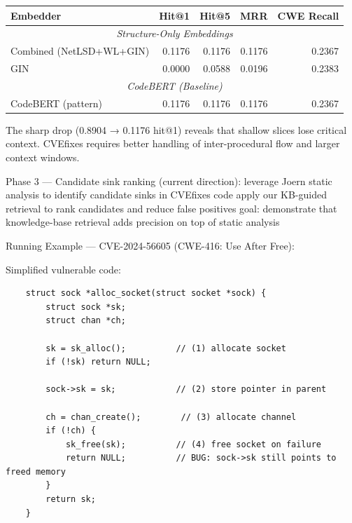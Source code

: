     \begin{center}
    \begin{tabular}{|l|r|r|r|r|}
    \hline
    \textbf{Embedder} & \textbf{Hit@1} & \textbf{Hit@5} & \textbf{MRR} & \textbf{CWE Recall} \\
    \hline
    \hline
    \multicolumn{5}{|c|}{\textit{Structure-Only Embeddings}} \\
    \hline
    Combined (NetLSD+WL+GIN) & 0.1176 & 0.1176 & 0.1176 & 0.2367 \\
    GIN & 0.0000 & 0.0588 & 0.0196 & 0.2383 \\
    \hline
    \multicolumn{5}{|c|}{\textit{CodeBERT (Baseline)}} \\
    \hline
    CodeBERT (pattern) & 0.1176 & 0.1176 & 0.1176 & 0.2367 \\
    \hline
    \end{tabular}
    \end{center}

    The sharp drop (0.8904 → 0.1176 hit@1) reveals that shallow slices lose critical context. CVEfixes requires better handling of inter-procedural flow and larger context windows.

Phase 3 — Candidate sink ranking (current direction):
    leverage Joern static analysis to identify candidate sinks in CVEfixes code
    apply our KB-guided retrieval to rank candidates and reduce false positives
    goal: demonstrate that knowledge-base retrieval adds precision on top of static analysis


Running Example — CVE-2024-56605 (CWE-416: Use After Free):

    Simplified vulnerable code:
    \begin{verbatim}
    struct sock *alloc_socket(struct socket *sock) {
        struct sock *sk;
        struct chan *ch;

        sk = sk_alloc();          // (1) allocate socket
        if (!sk) return NULL;

        sock->sk = sk;            // (2) store pointer in parent

        ch = chan_create();        // (3) allocate channel
        if (!ch) {
            sk_free(sk);          // (4) free socket on failure
            return NULL;          // BUG: sock->sk still points to freed memory
        }
        return sk;
    }
    \end{verbatim}

